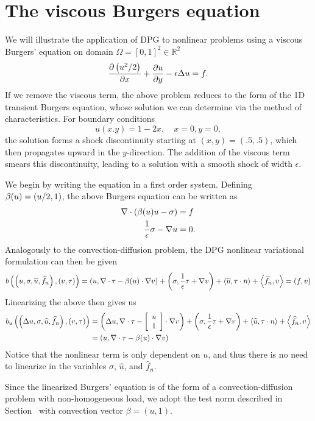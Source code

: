 \section{The viscous Burgers equation}

We will illustrate the application of DPG to nonlinear problems using a viscous Burgers' equation on domain $\Omega = [0,1]^2 \in \mathbb{R}^2$
\[
\pd{\left(u^2/2\right)}{x} + \pd{u}{y} - \epsilon \Delta u = f.
\]
If we remove the viscous term, the above problem reduces to the form of the 1D transient Burgers equation, whose solution we can determine via the method of characteristics.  For boundary conditions 
\[
u(x.y) = 1-2x, \quad x = 0, y = 0,
\]
the solution forms a shock discontinuity starting at $(x,y) = (.5,.5)$, which then propagates upward in the $y$-direction.  The addition of the viscous term smears this discontinuity, leading to a solution with a smooth shock of width $\epsilon$.  

We begin by writing the equation in a first order system.  Defining $\beta(u) = \LRp{u/2,1}$, the above Burgers equation can be written as
\begin{align*}
\div\left(\beta(u)u-\sigma\right) &=f \\
\frac{1}{\epsilon}\sigma - \grad u &=0.
\end{align*}
Analogously to the convection-diffusion problem, the DPG nonlinear variational formulation can then be given
\[
b\left(\left(u,\sigma,\widehat{u},\widehat{f}_n\right),\left(v,\tau\right)\right) = \LRp{u,\div \tau - \beta(u) \cdot \grad v} + \LRp{\sigma, \frac{1}{\epsilon}\tau + \grad v} + \LRa{\widehat{u},\tau\cdot n} + \LRa{\widehat{f}_n,v} = \LRp{f,v}
\]
Linearizing the above then gives us 
\begin{align*}
b_u\left(\left(\Delta u,\sigma,\widehat{u},\widehat{f}_n\right),\left(v,\tau\right)\right) &= \LRp{\Delta u,\div \tau - \vecttwo{u}{1} \cdot \grad v} + \LRp{\sigma, \frac{1}{\epsilon}\tau + \grad v} + \LRa{\widehat{u},\tau\cdot n} + \LRa{\widehat{f}_n,v} \\
&= \LRp{u,\div \tau - \beta(u)\cdot \grad v} 
\end{align*}
Notice that the nonlinear term is only dependent on $u$, and thus there is no need to linearize in the variables $\sigma$, $\widehat{u}$, and $\widehat{f}_n$.  

Since the linearized Burgers' equation is of the form of a convection-diffusion problem with non-homogeneous load, we adopt the test norm described in Section~ with convection vector $\beta = (u,1)$.  

